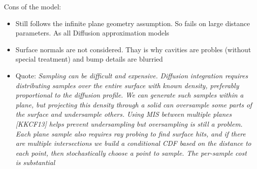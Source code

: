 Cons of the model:
\begin{itemize}
  \item {Still follows the infinite plane geometry assumption. So fails on
  large distance parameters. As all Diffusion approximation models}
  \item {Surface normals are not considered. Thay is why cavities are probles
  (without special treatment) and bump details are blurried}
  \item{Quote: \textit{Sampling can be difficult and expensive. Diffusion
  integration requires distributing samples over the entire surface with known
  density, preferably proportional to the diffusion profile. We can generate
  such samples within a plane, but projecting this density through a solid can
  oversample some parts of the surface and undersample others. Using MIS between
  multiple planes [KKCF13] helps prevent undersampling but oversampling is still
  a problem. Each plane sample also requires ray probing to find surface hits,
  and if there are multiple intersections we build a conditional CDF based on
  the distance to each point, then stochastically choose a point to sample. The
  per-sample cost is substantial}}
\end{itemize}